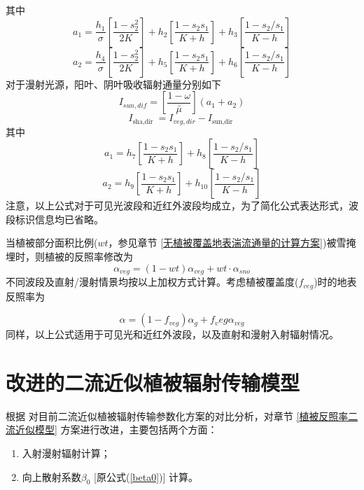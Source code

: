其中
\begin{equation}
a_{1}=\frac{h_{1}}{\sigma}\left[\frac{1-s_{2}^{2}}{2 K}\right]+h_{2}\left[\frac{1-s_{2} s_{1}}{K+h}\right]+h_{3}\left[\frac{1-s_{2} / s_{1}}{K-h}\right]
\end{equation}
\begin{equation}
a_{2}=\frac{h_{4}}{\sigma}\left[\frac{1-s_{2}^{2}}{2 K}\right]+h_{5}\left[\frac{1-s_{2} s_{1}}{K+h}\right]+h_{6}\left[\frac{1-s_{2} / s_{1}}{K-h}\right]
\end{equation}
对于漫射光源，阳叶、阴叶吸收辐射通量分别如下
\begin{equation}
I_{sun,dif}=\left[\frac{1-\omega}{\bar{\mu}}\right]\left(a_{1}+a_{2}\right)
\end{equation}
\begin{equation}
I_{\text {sha,dir }}=I_{veg, dir}-I_{\text {sun,dir }}
\end{equation}
其中
\begin{equation}
a_{1}=h_{7}\left[\frac{1-s_{2} s_{1}}{K+h}\right]+h_{8}\left[\frac{1-s_{2} / s_{1}}{K-h}\right]
\end{equation}
\begin{equation}
a_{2}=h_{9}\left[\frac{1-s_{2} s_{1}}{K+h}\right]+h_{10}\left[\frac{1-s_{2} / s_{1}}{K-h}\right]
\end{equation}
注意，以上公式对于可见光波段和近红外波段均成立，为了简化公式表达形式，波段标识信息均已省略。


当植被部分面积比例($wt$，参见章节 \ref{无植被覆盖地表湍流通量的计算方案})被雪掩埋时，则植被的反照率修改为
\begin{equation}
\alpha_{veg}=(1-w t) \alpha_{veg}+w t \cdot \alpha_{sno}
\end{equation}
不同波段及直射/漫射情景均按以上加权方式计算。考虑植被覆盖度($f_{veg}$)时的地表反照率为

\begin{equation}\label{alpha1}
\alpha=\left(1-f_{veg}\right) \alpha_{g}+f_veg \alpha_{veg}
\end{equation}
同样，以上公式适用于可见光和近红外波段，以及直射和漫射入射辐射情况。


\section{改进的二流近似植被辐射传输模型}
根据 \citet{yuan2017reexamination} 对目前二流近似植被辐射传输参数化方案的对比分析，对章节 \ref{植被反照率二流近似模型} 方案进行改进，主要包括两个方面：
\begin{enumerate}
    \item 入射漫射辐射计算；
    \item 向上散射系数$\beta_0$ [原公式(\ref{beta0})] 计算。
\end{enumerate}

